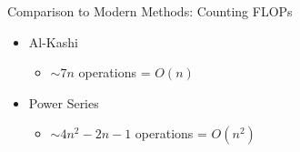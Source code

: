 \documentclass[10pt]{beamer}
\begin{document}
\begin{frame}{Comparison to Modern Methods: Counting FLOPs}
  \begin{itemize}
    \item Al-Kashi
    \begin{itemize}
      \item $\sim 7n$ operations  = $O(n)$ 
    \end{itemize}
    \item Power Series 
    \begin{itemize}
      \item $\sim 4n^2 - 2n - 1$ operations = $O(n^2)$
    \end{itemize}
  \end{itemize}
\end{frame}
\end{document}
